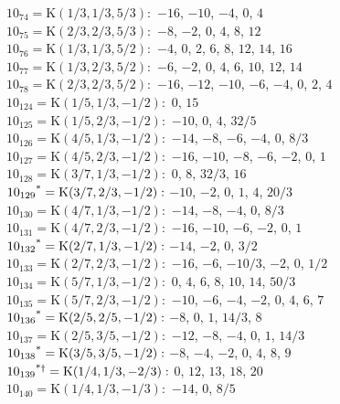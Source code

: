 $10_{74} = \mathrm{K}(1/3, 1/3, 5/3):$  $-16$, $-10$, $-4$, $0$, $4$\\ 
$10_{75} = \mathrm{K}(2/3, 2/3, 5/3):$  $-8$, $-2$, $0$, $4$, $8$, $12$\\ 
$10_{76} = \mathrm{K}(1/3, 1/3, 5/2):$  $-4$, $0$, $2$, $6$, $8$, $12$, $14$, $16$\\ 
$10_{77} = \mathrm{K}(1/3, 2/3, 5/2):$  $-6$, $-2$, $0$, $4$, $6$, $10$, $12$, $14$\\ 
$10_{78} = \mathrm{K}(2/3, 2/3, 5/2):$  $-16$, $-12$, $-10$, $-6$, $-4$, $0$, $2$, $4$\\ 
$10_{124} = \mathrm{K}(1/5, 1/3, -1/2):$  $0$, $15$\\ 
$10_{125} = \mathrm{K}(1/5, 2/3, -1/2):$  $-10$, $0$, $4$, $32/5$\\ 
$10_{126} = \mathrm{K}(4/5, 1/3, -1/2):$  $-14$, $-8$, $-6$, $-4$, $0$, $8/3$\\ 
$10_{127} = \mathrm{K}(4/5, 2/3, -1/2):$  $-16$, $-10$, $-8$, $-6$, $-2$, $0$, $1$\\ 
$10_{128} = \mathrm{K}(3/7, 1/3, -1/2):$  $0$, $8$, $32/3$, $16$\\ 
$10_{129}\textsuperscript{*} = \mathrm{K}(3/7, 2/3, -1/2):$  $-10$, $-2$, $0$, $1$, $4$, $20/3$\\ 
$10_{130} = \mathrm{K}(4/7, 1/3, -1/2):$  $-14$, $-8$, $-4$, $0$, $8/3$\\ 
$10_{131} = \mathrm{K}(4/7, 2/3, -1/2):$  $-16$, $-10$, $-6$, $-2$, $0$, $1$\\ 
$10_{132}\textsuperscript{*} = \mathrm{K}(2/7, 1/3, -1/2):$  $-14$, $-2$, $0$, $3/2$\\ 
$10_{133} = \mathrm{K}(2/7, 2/3, -1/2):$  $-16$, $-6$, $-10/3$, $-2$, $0$, $1/2$\\ 
$10_{134} = \mathrm{K}(5/7, 1/3, -1/2):$  $0$, $4$, $6$, $8$, $10$, $14$, $50/3$\\ 
$10_{135} = \mathrm{K}(5/7, 2/3, -1/2):$  $-10$, $-6$, $-4$, $-2$, $0$, $4$, $6$, $7$\\ 
$10_{136}\textsuperscript{*} = \mathrm{K}(2/5, 2/5, -1/2):$  $-8$, $0$, $1$, $14/3$, $8$\\ 
$10_{137} = \mathrm{K}(2/5, 3/5, -1/2):$  $-12$, $-8$, $-4$, $0$, $1$, $14/3$\\ 
$10_{138}\textsuperscript{*} = \mathrm{K}(3/5, 3/5, -1/2):$  $-8$, $-4$, $-2$, $0$, $4$, $8$, $9$\\ 
$10_{139}\textsuperscript{*$\dagger$} = \mathrm{K}(1/4, 1/3, -2/3):$  $0$, $12$, $13$, $18$, $20$\\ 
$10_{140} = \mathrm{K}(1/4, 1/3, -1/3):$  $-14$, $0$, $8/5$\\ 
